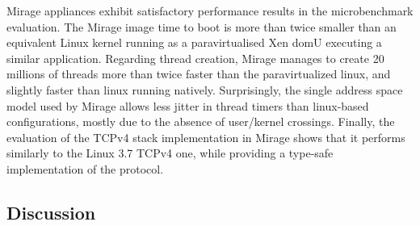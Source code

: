 Mirage appliances exhibit satisfactory performance results in the microbenchmark evaluation.
The Mirage image time to boot is more than twice smaller than an equivalent Linux kernel running as a paravirtualised Xen domU executing a similar application.
Regarding thread creation, Mirage manages to create 20 millions of threads more than twice faster than the paravirtualized linux, and slightly faster than linux running natively.
Surprisingly, the single address space model used by Mirage allows less jitter in thread timers than linux-based configurations, mostly due to the absence of user/kernel crossings.
Finally, the evaluation of the TCPv4 stack implementation in Mirage shows that it performs similarly to the Linux 3.7 TCPv4 one, while providing a type-safe implementation of the protocol.


\subsection{Discussion}
%
%
%
%
